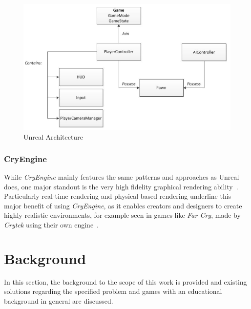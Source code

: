 \begin{figure}
    \centering
    \includegraphics[width=\textwidth]{Pictures/res/fundamentals/unreal-framework}
    \caption{Unreal Architecture~\cite{UNREAL:Framework}}
    \label{fig:unreal-concept}
\end{figure}
\subsubsection{CryEngine}\label{subsubsec:cryengine}
While \textit{CryEngine} mainly features the same patterns and approaches as Unreal does, one major standout is the very high fidelity graphical rendering
ability~\cite{cryengine-docu}.
Particularly real-time rendering and physical based rendering underline this major benefit of using \textit{CryEngine}, as it enables
creators and designers to create highly realistic environments, for example seen in games like \textit{Far Cry}, made by \textit{Crytek} using their own
engine~\cite{cryengine}.

\section{Background}\label{sec:background}
In this section, the background to the scope of this work is provided and existing solutions regarding the specified problem and
games with an educational background in general are discussed.

